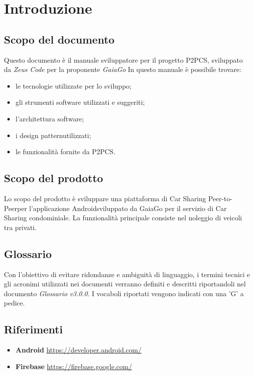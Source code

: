 \section{Introduzione} 
\subsection{Scopo del documento}
Questo documento è il manuale sviluppatore per il progetto P2PCS, sviluppato da \textit{Zeus Code} per la proponente \textit{GaiaGo}
In questo manuale è possibile trovare:
\begin{itemize}
	\item le tecnologie utilizzate per lo sviluppo;
	\item gli strumenti software utilizzati e suggeriti;
	\item l'architettura software;
	\item i design pattern\glosp utilizzati;
	\item le funzionalità fornite da P2PCS.
\end{itemize}
\subsection{Scopo del prodotto}
Lo scopo del prodotto è sviluppare una piattaforma di Car Sharing Peer-to-Peer\glosp per l'applicazione Android\glosp sviluppato da GaiaGo per il servizio di Car Sharing condominiale. La funzionalità principale consiste nel noleggio di veicoli tra privati.
\subsection{Glossario}
Con l’obiettivo di evitare ridondanze e ambiguità di linguaggio, i termini tecnici e gli acronimi utilizzati nei documenti verranno definiti e descritti riportandoli nel documento \textit{Glossario v3.0.0}.  I vocaboli riportati vengono indicati con una 'G' a pedice.
\subsection{Riferimenti}
\begin{itemize}
	\item \textbf{Android} \url{https://developer.android.com/}
	\item \textbf{Firebase} \url{https://firebase.google.com/}	
\end{itemize}